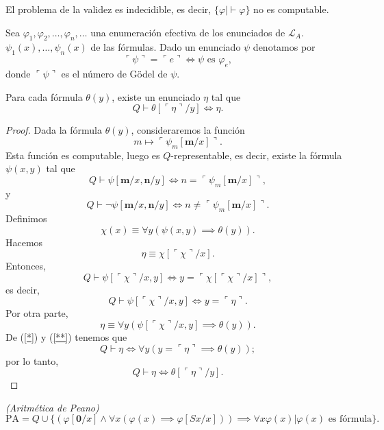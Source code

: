 \begin{cor}
    El problema de la validez es indecidible, es decir, $\{\varphi|\vdash\varphi\}$ no es computable.
\end{cor}
\begin{obs}
    Sea $\varphi_1,\varphi_2,\ldots,\varphi_n,\ldots$ una enumeración efectiva de los enunciados de $\mathcal{L}_A$. $\psi_1(x),\ldots,\psi_n(x)$ de las fórmulas. Dado un enunciado $\psi$ denotamos por 
    \[\ulcorner\psi\urcorner=\ulcorner e\urcorner\Longleftrightarrow\psi \text{ es }\varphi_e,\]
    donde $\ulcorner\psi\urcorner$ es el número de Gödel de $\psi$.
\end{obs}
\begin{lem}
    Para cada fórmula $\theta(y)$, existe un enunciado $\eta$ tal que
    \[Q\vdash\theta[\ulcorner\eta\urcorner/y]\Longleftrightarrow\eta.\]
\end{lem}
\begin{proof}
    Dada la fórmula $\theta(y)$, consideraremos la función
    \[m\mapsto\ulcorner\psi_m[\mathbf{m}/x]\urcorner.\]
    Esta función es computable, luego es $Q$-representable, es decir, existe la fórmula $\psi(x,y)$ tal que
    \[Q\vdash\psi[\mathbf{m}/x,\mathbf{n}/y]\Longleftrightarrow n=\ulcorner\psi_m[\mathbf{m}/x]\urcorner,\]
    y
    \[Q\vdash\neg\psi[\mathbf{m}/x,\mathbf{n}/y]\Longleftrightarrow n\neq\ulcorner\psi_m[\mathbf{m}/x]\urcorner.\]
    Definimos
    \[\chi(x)\equiv\forall y(\psi(x,y)\implies\theta(y)).\]
    Hacemos
    \[\eta\equiv\chi[\ulcorner\chi\urcorner/x].\]
    Entonces, 
    \[Q\vdash\psi[\ulcorner\chi\urcorner/x,y]\Longleftrightarrow y=\ulcorner\chi[\ulcorner\chi\urcorner/x]\urcorner,\]
    es decir, 
    \begin{equation}\label{*}\tag{*}
        Q\vdash\psi[\ulcorner\chi\urcorner/x,y]\Longleftrightarrow y=\ulcorner\eta\urcorner.
    \end{equation}
    Por otra parte,
    \begin{equation}\label{**}\tag{**}
        \eta\equiv\forall y(\psi[\ulcorner\chi\urcorner/x,y]\implies\theta(y)).
    \end{equation}
    De {(\ref{*})} y {(\ref{**})} tenemos que
    \[Q\vdash\eta\Longleftrightarrow\forall y(y=\ulcorner\eta\urcorner\implies\theta(y));\]
    por lo tanto,
    \[Q\vdash\eta\Longleftrightarrow\theta[\ulcorner\eta\urcorner/y].\]
\end{proof}

\begin{defn} \textit{(Aritmética de Peano)}
    \[\text{PA}=Q\cup\{(\varphi[\mathbf{0}/x]\land\forall x(\varphi(x)\implies\varphi[Sx/x]))\implies\forall x\varphi(x)|\varphi(x)\text{ es fórmula}\}.\]
\end{defn}


